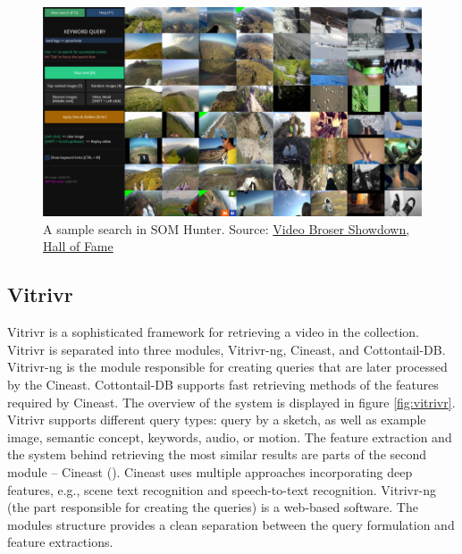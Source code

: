 \begin{figure}
    \centering
    \includegraphics[width=0.99\linewidth]{img/som_hunter_small.png}
    \caption{A sample search in SOM Hunter. Source: \href{https://videobrowsershowdown.org/hall-of-fame/}{Video Broser Showdown, Hall of Fame}}
    \label{fig:som_hunter}
\end{figure}

\subsection{Vitrivr}

Vitrivr \citep{rossetto2016vitrivr} is a sophisticated framework for retrieving a video in the collection. Vitrivr is separated into three modules, Vitrivr-ng, Cineast, and Cottontail-DB.  Vitrivr-ng is the module responsible for creating queries that are later processed by the Cineast. Cottontail-DB supports fast retrieving methods of the features required by Cineast. The overview of the system is displayed in figure \ref{fig:vitrivr}. Vitrivr supports different query types: query by a sketch, as well as example image, semantic concept, keywords, audio, or motion. The feature extraction and the system behind retrieving the most similar results are parts of the second module -- Cineast (\cite{rossetto2016searching}). Cineast uses multiple approaches incorporating deep features, e.g., scene text recognition and speech-to-text recognition. Vitrivr-ng (the part responsible for creating the queries) is a web-based software. The modules structure provides a clean separation between the query formulation and feature extractions.

